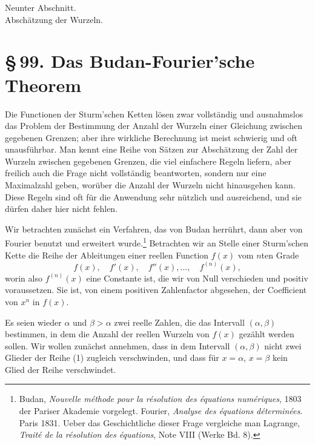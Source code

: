 \documentclass[11pt]{article}
\providecommand{\sect}[2]{\section*{\S\,#1. #2}}
\begin{document}
\begin{center}
{\large Neunter Abschnitt.}\\[0.6em]
{\Large Abschätzung der Wurzeln.}
\end{center}

\sect{99}{Das Budan-Fourier'sche Theorem}

Die Functionen der Sturm'schen Ketten lösen zwar vollständig und ausnahmslos das Problem der Bestimmung der Anzahl der Wurzeln einer Gleichung zwischen gegebenen Grenzen; aber ihre wirkliche Berechnung ist meist schwierig und oft unausführbar. Man kennt eine Reihe von Sätzen zur Abschätzung der Zahl der Wurzeln zwischen gegebenen Grenzen, die viel einfachere Regeln liefern, aber freilich auch die Frage nicht vollständig beantworten, sondern nur eine Maximalzahl geben, worüber die Anzahl der Wurzeln nicht hinausgehen kann. Diese Regeln sind oft für die Anwendung sehr nützlich und ausreichend, und sie dürfen daher hier nicht fehlen.

Wir betrachten zunächst ein Verfahren, das von Budan herrührt, dann aber von Fourier benutzt und erweitert wurde.\footnote{Budan, \emph{Nouvelle méthode pour la résolution des équations numériques}, 1803 der Pariser Akademie vorgelegt. Fourier, \emph{Analyse des équations déterminées}. Paris 1831. Ueber das Geschichtliche dieser Frage vergleiche man Lagrange, \emph{Traité de la résolution des équations}, Note VIII (Werke Bd. 8).} Betrachten wir an Stelle einer Sturm'schen Kette die Reihe der Ableitungen einer reellen Function $f(x)$ vom $n$ten Grade
\begin{equation}
        f(x),\quad f'(x),\quad f''(x),\ldots,\quad f^{(n)}(x),
\tag{1}
\end{equation}
worin also $f^{(n)}(x)$ eine Constante ist, die wir von Null verschieden und positiv voraussetzen. Sie ist, von einem positiven Zahlenfactor abgesehen, der Coefficient von $x^n$ in $f(x)$.

Es seien wieder $\alpha$ und $\beta>\alpha$ zwei reelle Zahlen, die das Intervall $(\alpha,\beta)$ bestimmen, in dem die Anzahl der reellen Wurzeln von $f(x)$ gezählt werden sollen. Wir wollen zunächst annehmen, dass in dem Intervall $(\alpha,\beta)$ nicht zwei Glieder der Reihe (1) zugleich verschwinden, und dass für $x=\alpha$, $x=\beta$ kein Glied der Reihe verschwindet.
\end{document}
